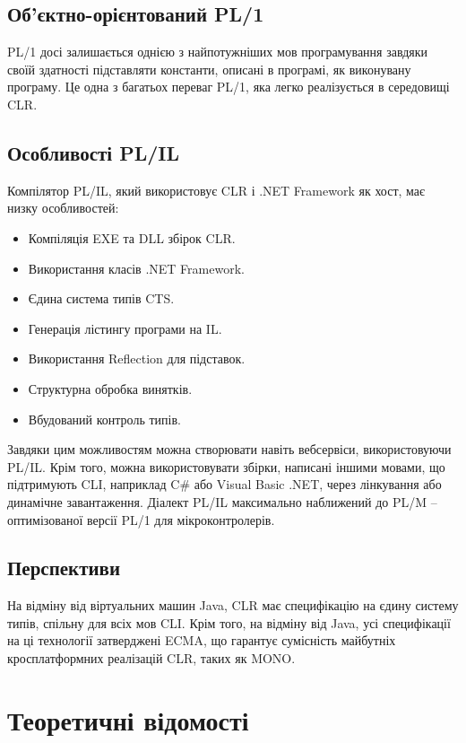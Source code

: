 \documentclass{memoir}
\begin{document}
\section{Об’єктно-орієнтований PL/1}
PL/1 досі залишається однією з найпотужніших мов програмування завдяки своїй здатності підставляти константи, описані в програмі, як виконувану програму. Це одна з багатьох переваг PL/1, яка легко реалізується в середовищі CLR.

\section{Особливості PL/IL}
Компілятор PL/IL, який використовує CLR і .NET Framework як хост, має низку особливостей:
\begin{itemize}
    \item Компіляція EXE та DLL збірок CLR.
    \item Використання класів .NET Framework.
    \item Єдина система типів CTS.
    \item Генерація лістингу програми на IL.
    \item Використання Reflection для підставок.
    \item Структурна обробка винятків.
    \item Вбудований контроль типів.
\end{itemize}
Завдяки цим можливостям можна створювати навіть вебсервіси, використовуючи PL/IL. Крім того, можна використовувати збірки, написані іншими мовами, що підтримують CLI, наприклад C\# або Visual Basic .NET, через лінкування або динамічне завантаження. Діалект PL/IL максимально наближений до PL/M – оптимізованої версії PL/1 для мікроконтролерів.

\section{Перспективи}
На відміну від віртуальних машин Java, CLR має специфікацію на єдину систему типів, спільну для всіх мов CLI. Крім того, на відміну від Java, усі специфікації на ці технології затверджені ECMA, що гарантує сумісність майбутніх кросплатформних реалізацій CLR, таких як MONO.

\chapter{Теоретичні відомості}
\end{document}
